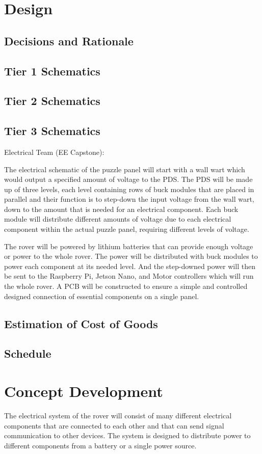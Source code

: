 \documentclass[a4paper, 10pt]{article}
\begin{document}
\section{Design}
	\subsection{Decisions and Rationale}
	\subsection{Tier 1 Schematics}
	\subsection{Tier 2 Schematics}
	\subsection{Tier 3 Schematics}
	Electrical Team (EE Capstone):
	
The electrical schematic of the puzzle panel will start with a wall wart which would output a specified amount of voltage to the PDS. The PDS will be made up of three levels, each level containing rows of buck modules that are placed in parallel and their function is to step-down the input voltage from the wall wart, down to the amount that is needed for an electrical component. Each buck module will distribute different amounts of voltage due to each electrical component within the actual puzzle panel, requiring different levels of voltage.

The rover will be powered by lithium batteries that can provide enough voltage or power to the whole rover. The power will be distributed with buck modules to power each component at its needed level. And the step-downed power will then be sent to the Raspberry Pi, Jetson Nano, and Motor controllers which will run the whole rover. A PCB will be constructed to ensure a simple and controlled designed connection of essential components on a single panel.

	\subsection{Estimation of Cost of Goods}
	\subsection{Schedule}
	
\pagebreak	

\section{Concept Development}
The electrical system of the rover will consist of many different electrical components that are connected to each other and that can send signal communication to other devices. The system is designed to distribute power to different components from a battery or a single power source.
	
\end{document}

